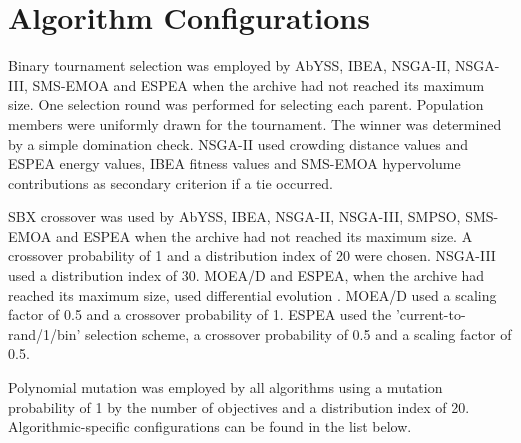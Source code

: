 \FloatBarrier
\appendix

\section{Algorithm Configurations}
\label{sec:algosetup}
Binary tournament \cite{binarytournament} selection was employed by AbYSS, IBEA, NSGA-II, NSGA-III, SMS-EMOA and ESPEA when the archive had not reached its maximum size. One selection round was performed for selecting each parent. Population members were uniformly drawn for the tournament. The winner was determined by a simple domination check. NSGA-II used crowding distance values and ESPEA energy values, IBEA fitness values and SMS-EMOA hypervolume contributions as secondary criterion if a tie occurred.

SBX crossover \cite{sbx} was used by AbYSS, IBEA, NSGA-II, NSGA-III, SMPSO, SMS-EMOA and ESPEA when the archive had not reached its maximum size. A crossover probability of 1 and a distribution index of 20 were chosen. NSGA-III used a distribution index of 30. MOEA/D and ESPEA, when the archive had reached its maximum size, used differential evolution \cite{differentialevolutionjournal}. MOEA/D used a scaling factor of 0.5 and a crossover probability of 1. ESPEA used the 'current-to-rand/1/bin' selection scheme, a crossover probability of 0.5 and a scaling factor of 0.5.

Polynomial mutation \cite{polynomialmutation} was employed by all algorithms using a mutation probability of 1 by the number of objectives and a distribution index of 20. Algorithmic-specific configurations can be found in the list below.

